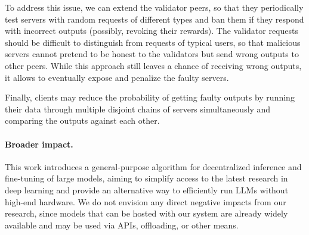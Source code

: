 To address this issue, we can extend the validator peers, so that they periodically test servers with random requests of different types and ban them if they respond with incorrect outputs (possibly, revoking their rewards). The validator requests should be difficult to distinguish from requests of typical users, so that malicious servers cannot pretend to be honest to the validators but send wrong outputs to other peers. While this approach still leaves a chance of receiving wrong outputs, it allows to eventually expose and penalize the faulty servers.

Finally, clients may reduce the probability of getting faulty outputs by running their data through multiple disjoint chains of servers simultaneously and comparing the outputs against each other.

\paragraph{Broader impact.}
This work introduces a general-purpose algorithm for decentralized inference and fine-tuning of large models, aiming to simplify access to the latest research in deep learning and provide an alternative way to efficiently run LLMs without high-end hardware. We do not envision any direct negative impacts from our research, since models that can be hosted with our system are already widely available and may be used via APIs, offloading, or other means.











